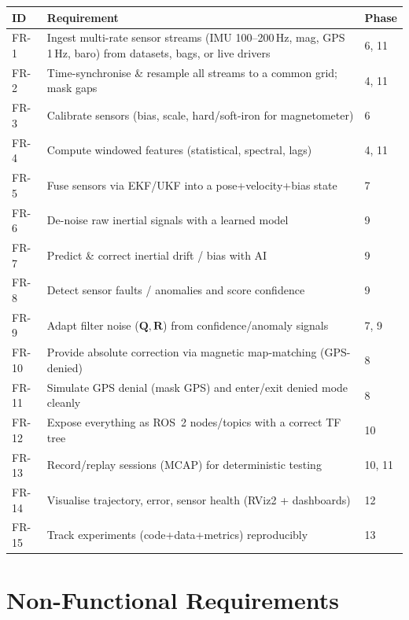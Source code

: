 \documentclass[11pt]{article}
\newcommand{\vv}[1]{\mathbf{#1}}
\begin{document}
\begin{center}\footnotesize
\begin{tabular}{@{}p{1.3cm}p{7.4cm}p{3.6cm}@{}}
\toprule
\textbf{ID} & \textbf{Requirement} & \textbf{Phase}\\
\midrule
FR-1 & Ingest multi-rate sensor streams (IMU 100--200\,Hz, mag, GPS 1\,Hz, baro) from datasets, bags, or live drivers & 6, 11\\
FR-2 & Time-synchronise \& resample all streams to a common grid; mask gaps & 4, 11\\
FR-3 & Calibrate sensors (bias, scale, hard/soft-iron for magnetometer) & 6\\
FR-4 & Compute windowed features (statistical, spectral, lags) & 4, 11\\
FR-5 & Fuse sensors via EKF/UKF into a pose+velocity+bias state & 7\\
FR-6 & De-noise raw inertial signals with a learned model & 9\\
FR-7 & Predict \& correct inertial drift / bias with AI & 9\\
FR-8 & Detect sensor faults / anomalies and score confidence & 9\\
FR-9 & Adapt filter noise ($\vv{Q},\vv{R}$) from confidence/anomaly signals & 7, 9\\
FR-10 & Provide absolute correction via magnetic map-matching (GPS-denied) & 8\\
FR-11 & Simulate GPS denial (mask GPS) and enter/exit denied mode cleanly & 8\\
FR-12 & Expose everything as ROS~2 nodes/topics with a correct TF tree & 10\\
FR-13 & Record/replay sessions (MCAP) for deterministic testing & 10, 11\\
FR-14 & Visualise trajectory, error, sensor health (RViz2 + dashboards) & 12\\
FR-15 & Track experiments (code+data+metrics) reproducibly & 13\\
\bottomrule
\end{tabular}
\end{center}

\section{Non-Functional Requirements}\label{sec:nfr}
\end{document}
